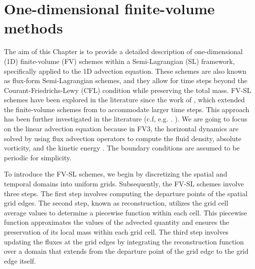 \chapter{One-dimensional finite-volume methods}
\label{chp-1d-fv}

\theoremstyle{plain}
\newtheorem{lema}{Lemma}[chapter]

\theoremstyle{plain}
\newtheorem{prop}{Proposition}[chapter]

\theoremstyle{plain}
\newtheorem{thrm}{Theorem}[chapter]

\theoremstyle{plain}
\newtheorem{remark}{Remark}[chapter]

\theoremstyle{plain}
\newtheorem{corollary}{Corollary}[chapter]

\theoremstyle{plain}
\newtheorem{definition}{Definition}[chapter]


The aim of this Chapter is to provide a detailed description of one-dimensional (1D) 
finite-volume (FV) schemes within a Semi-Lagrangian (SL) framework, specifically applied to 
the 1D advection equation.
These schemes are also known as flux-form Semi-Lagrangian schemes, and they allow for time steps beyond the 
Courant-Friedrichs-Lewy (CFL) condition while preserving the total mass.
FV-SL schemes have been explored in the literature since the work of  \citet{leveque:1985},
which extended the finite-volume schemes from \citet{godunov:1959}  to accommodate larger time steps.
This approach has been further investigated in the literature (c.f, e.g. . \citet{lin:1996,leonard:1996}).
We are going to focus on the linear advection equation because in FV3, the horizontal dynamics
are solved by using flux advection operators to compute the fluid density, absolute vorticity, 
and the kinetic energy \citep{lin:1997,putmanthesis:2007, harris:2013, harris:2021}.
The boundary conditions are assumed to be periodic for simplicity.

To introduce the FV-SL schemes, we begin by discretizing the spatial and temporal domains into uniform grids.
Subsequently, the FV-SL schemes involve three steps.
The first step involves computing the departure points of the spatial grid edges.
The second step, known as reconstruction, utilizes the grid cell average values to
determine a piecewise function within each cell. This piecewise function approximates the
values of the advected quantity and ensures the preservation of its local mass within each grid cell.
The third step involves updating the fluxes at the grid edges by integrating the reconstruction function 
over a domain that extends from the departure point of the grid edge to the grid edge itself.

